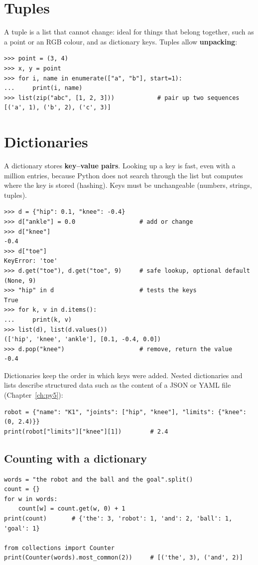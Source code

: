 \section*{Tuples}
A tuple is a list that cannot change: ideal for things that belong together, such as a point or an RGB colour, and as dictionary keys. Tuples allow \textbf{unpacking}:
\begin{verbatim}
>>> point = (3, 4)
>>> x, y = point
>>> for i, name in enumerate(["a", "b"], start=1):
...     print(i, name)
>>> list(zip("abc", [1, 2, 3]))            # pair up two sequences
[('a', 1), ('b', 2), ('c', 3)]
\end{verbatim}

\section*{Dictionaries}
A dictionary stores \textbf{key--value pairs}. Looking up a key is fast, even with a million entries, because Python does not search through the list but computes where the key is stored (hashing). Keys must be unchangeable (numbers, strings, tuples).
\begin{verbatim}
>>> d = {"hip": 0.1, "knee": -0.4}
>>> d["ankle"] = 0.0                  # add or change
>>> d["knee"]
-0.4
>>> d["toe"]
KeyError: 'toe'
>>> d.get("toe"), d.get("toe", 9)     # safe lookup, optional default
(None, 9)
>>> "hip" in d                        # tests the keys
True
>>> for k, v in d.items():
...     print(k, v)
>>> list(d), list(d.values())
(['hip', 'knee', 'ankle'], [0.1, -0.4, 0.0])
>>> d.pop("knee")                     # remove, return the value
-0.4
\end{verbatim}
Dictionaries keep the order in which keys were added. Nested dictionaries and lists describe structured data such as the content of a JSON or YAML file (Chapter~\ref{ch:py5}):
\begin{verbatim}
robot = {"name": "K1", "joints": ["hip", "knee"], "limits": {"knee": (0, 2.4)}}
print(robot["limits"]["knee"][1])        # 2.4
\end{verbatim}

\subsection*{Counting with a dictionary}
\begin{verbatim}
words = "the robot and the ball and the goal".split()
count = {}
for w in words:
    count[w] = count.get(w, 0) + 1
print(count)       # {'the': 3, 'robot': 1, 'and': 2, 'ball': 1, 'goal': 1}

from collections import Counter
print(Counter(words).most_common(2))     # [('the', 3), ('and', 2)]
\end{verbatim}

